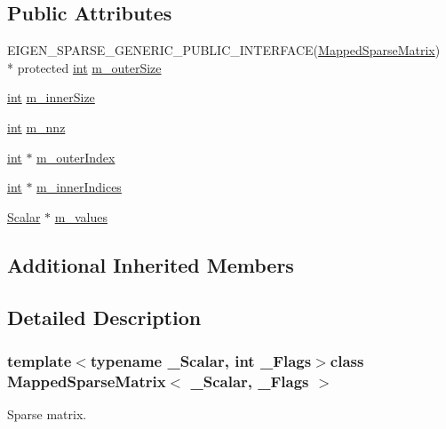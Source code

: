 \subsection*{Public Attributes}
\begin{DoxyCompactItemize}
\item 
E\-I\-G\-E\-N\-\_\-\-S\-P\-A\-R\-S\-E\-\_\-\-G\-E\-N\-E\-R\-I\-C\-\_\-\-P\-U\-B\-L\-I\-C\-\_\-\-I\-N\-T\-E\-R\-F\-A\-C\-E(\hyperlink{class_mapped_sparse_matrix}{Mapped\-Sparse\-Matrix}) \\*
protected \hyperlink{ioapi_8h_a787fa3cf048117ba7123753c1e74fcd6}{int} \hyperlink{class_mapped_sparse_matrix_af65bb4f338bcf978e2d143efcfe2ed19}{m\-\_\-outer\-Size}
\item 
\hyperlink{ioapi_8h_a787fa3cf048117ba7123753c1e74fcd6}{int} \hyperlink{class_mapped_sparse_matrix_ac098d439a21b0fea20d87dca6fa31d0e}{m\-\_\-inner\-Size}
\item 
\hyperlink{ioapi_8h_a787fa3cf048117ba7123753c1e74fcd6}{int} \hyperlink{class_mapped_sparse_matrix_a53a9c1e78c2cdb8304e3305d4abce668}{m\-\_\-nnz}
\item 
\hyperlink{ioapi_8h_a787fa3cf048117ba7123753c1e74fcd6}{int} $\ast$ \hyperlink{class_mapped_sparse_matrix_a5aa4957bfefea23e2eebedb9e7978509}{m\-\_\-outer\-Index}
\item 
\hyperlink{ioapi_8h_a787fa3cf048117ba7123753c1e74fcd6}{int} $\ast$ \hyperlink{class_mapped_sparse_matrix_a76219ea52c1e1e70a49b7748081bd57a}{m\-\_\-inner\-Indices}
\item 
\hyperlink{class_sparse_matrix_base_af39d70f2b7e775e9e17b666cd24128c8}{Scalar} $\ast$ \hyperlink{class_mapped_sparse_matrix_a66fbf9fe136e803d94d0366adaf4b586}{m\-\_\-values}
\end{DoxyCompactItemize}
\subsection*{Additional Inherited Members}


\subsection{Detailed Description}
\subsubsection*{template$<$typename \-\_\-\-Scalar, int \-\_\-\-Flags$>$class Mapped\-Sparse\-Matrix$<$ \-\_\-\-Scalar, \-\_\-\-Flags $>$}

Sparse matrix. 



